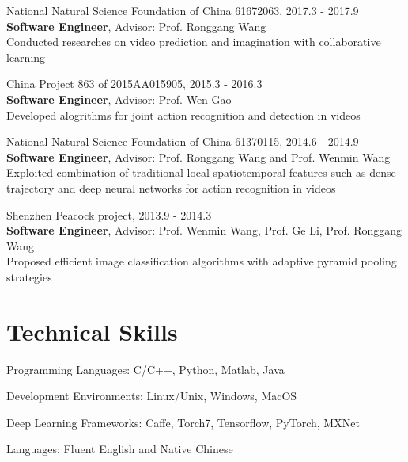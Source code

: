 \documentclass[letterpaper]{article}
\renewenvironment{itemize}{
  \begin{list}{}{
    \setlength{\leftmargin}{1.5em}
  }
}{
  \end{list}
}
\begin{document}
\begin{itemize}
    \item National Natural Science Foundation of China 61672063, 2017.3 - 2017.9 \\ 
       \textbf{Software Engineer},  Advisor: Prof. Ronggang Wang \\
        Conducted researches on video prediction and imagination with collaborative learning \\

    \item China Project 863 of 2015AA015905, 2015.3 - 2016.3 \\ 
        \textbf{Software Engineer}, Advisor: Prof. Wen Gao \\
        Developed alogrithms for joint action recognition and detection in videos \\

    \item National Natural Science Foundation of China 61370115, 2014.6 - 2014.9 \\ 
        \textbf{Software Engineer}, Advisor: Prof. Ronggang Wang and Prof. Wenmin Wang  \\
        Exploited combination of traditional local spatiotemporal features such as dense trajectory and deep neural networks for action recognition in videos \\

    \item Shenzhen Peacock project, 2013.9 - 2014.3 \\ 
        \textbf{Software Engineer}, Advisor: Prof. Wenmin Wang, Prof. Ge Li, Prof. Ronggang Wang \\
        Proposed efficient image classification algorithms with adaptive pyramid pooling strategies 
\end{itemize}


\section*{Technical Skills}


\begin{itemize}
    \item   Programming Languages: C/C++, Python, Matlab, Java
    \item   Development Environments: Linux/Unix, Windows, MacOS
    \item   Deep Learning Frameworks: Caffe, Torch7, Tensorflow, PyTorch, MXNet
    \item   Languages:   Fluent English and Native Chinese
\end{itemize}
\end{document}
